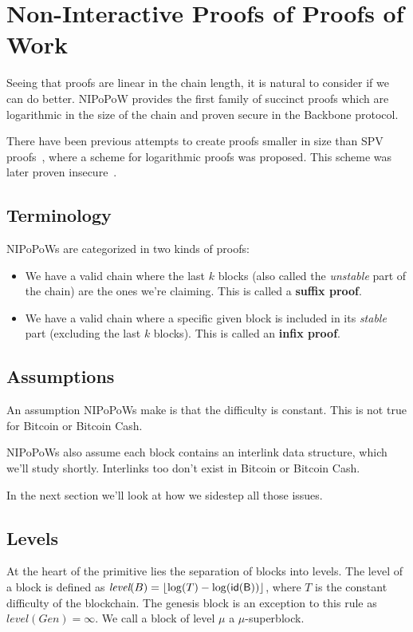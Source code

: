 \section{Non-Interactive Proofs of Proofs of Work}
Seeing that proofs are linear in the chain length, it is natural to consider if we can do better. NIPoPoW \cite{nipopows} provides the first family of succinct proofs which are logarithmic in the size of the chain and proven secure in the Backbone \cite{backbone} protocol.

There have been previous attempts to create proofs smaller in size than SPV proofs~\cite{KLS}, where a scheme for logarithmic proofs was proposed.  This scheme was later proven insecure~\cite{nipopows}.

\subsection{Terminology}
NIPoPoWs are categorized in two kinds of proofs:

\begin{itemize}
  \item We have a valid chain where the last $k$ blocks (also called the \textit{unstable} part of the chain) are the ones we're claiming. This is called a \textbf{suffix proof}.
  \item We have a valid chain where a specific given block is included in its \textit{stable} part (excluding the last $k$ blocks). This is called an \textbf{infix proof}.
\end{itemize}

\subsection{Assumptions}
An assumption NIPoPoWs make is that the difficulty is constant. This is not true for Bitcoin or Bitcoin Cash.


NIPoPoWs also assume each block contains an interlink data structure, which we'll study shortly. Interlinks too don't exist in Bitcoin or Bitcoin Cash.

In the next section we'll look at how we sidestep all those issues.

\subsection{Levels}
At the heart of the primitive lies the separation of blocks into levels. The level of a block is defined as $\textit{level}(B) = \left \lfloor \log(T) - \log(\sf{id}(B)) \right \rfloor$, where $T$ is the constant difficulty of the blockchain. The genesis block is an exception to this rule as $\textit{level}(Gen) = \infty$. We call a block of level $\mu$ a $\mu$-superblock.

